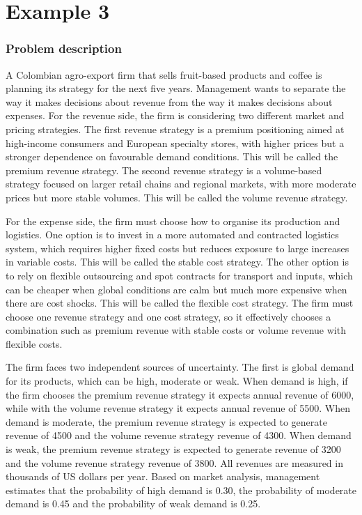 \chapter{Example 3}\label{sec:example3}

\subsection{Problem description}\label{subsec:example3-problem}

A Colombian agro-export firm that sells fruit-based products and coffee is planning its strategy for the next five years.
Management wants to separate the way it makes decisions about revenue from the way it makes decisions about expenses. For
the revenue side, the firm is considering two different market and pricing strategies. The first revenue strategy is a
premium positioning aimed at high-income consumers and European specialty stores, with higher prices but a stronger
dependence on favourable demand conditions. This will be called the premium revenue strategy. The second revenue strategy
is a volume-based strategy focused on larger retail chains and regional markets, with more moderate prices but more stable
volumes. This will be called the volume revenue strategy.

\medskip
For the expense side, the firm must choose how to organise its production and logistics. One option is to invest in a more
automated and contracted logistics system, which requires higher fixed costs but reduces exposure to large increases in
variable costs. This will be called the stable cost strategy. The other option is to rely on flexible outsourcing and spot
contracts for transport and inputs, which can be cheaper when global conditions are calm but much more expensive when there
are cost shocks. This will be called the flexible cost strategy. The firm must choose one revenue strategy and one cost
strategy, so it effectively chooses a combination such as premium revenue with stable costs or volume revenue with
flexible costs.

\medskip
The firm faces two independent sources of uncertainty. The first is global demand for its products, which can be high,
moderate or weak. When demand is high, if the firm chooses the premium revenue strategy it expects annual revenue of 6000,
while with the volume revenue strategy it expects annual revenue of 5500. When demand is moderate, the premium revenue
strategy is expected to generate revenue of 4500 and the volume revenue strategy revenue of 4300. When demand is weak, the
premium revenue strategy is expected to generate revenue of 3200 and the volume revenue strategy revenue of 3800. All
revenues are measured in thousands of US dollars per year. Based on market analysis, management estimates that the
probability of high demand is 0.30, the probability of moderate demand is 0.45 and the probability of weak demand is 0.25.

